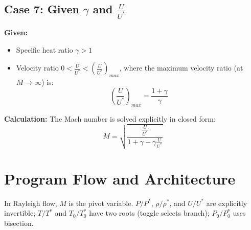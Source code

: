 \subsection*{Case 7: Given $\gamma$ and $\frac{U}{U^*}$}

\textbf{Given:}
\begin{itemize}[nosep]
    \item Specific heat ratio $\gamma > 1$
    \item Velocity ratio $0 < \frac{U}{U^*} < \left(\frac{U}{U^*}\right)_{max}$, where the maximum velocity ratio (at $M \to \infty$) is:
    \begin{equation}
    \left(\frac{U}{U^*}\right)_{max} = \frac{1+\gamma}{\gamma}
    \end{equation}
\end{itemize}

\textbf{Calculation:} The Mach number is solved explicitly in closed form:
\begin{equation}
M = \sqrt{\frac{\frac{U}{U^*}}{1+\gamma-\gamma\frac{U}{U^*}}}
\end{equation}




\section{Program Flow and Architecture}

In Rayleigh flow, $M$ is the pivot variable. $P/P^*$, $\rho/\rho^*$, and $U/U^*$ are explicitly invertible; $T/T^*$ and $T_0/T_0^*$ have two roots (toggle selects branch); $P_0/P_0^*$ uses bisection.

